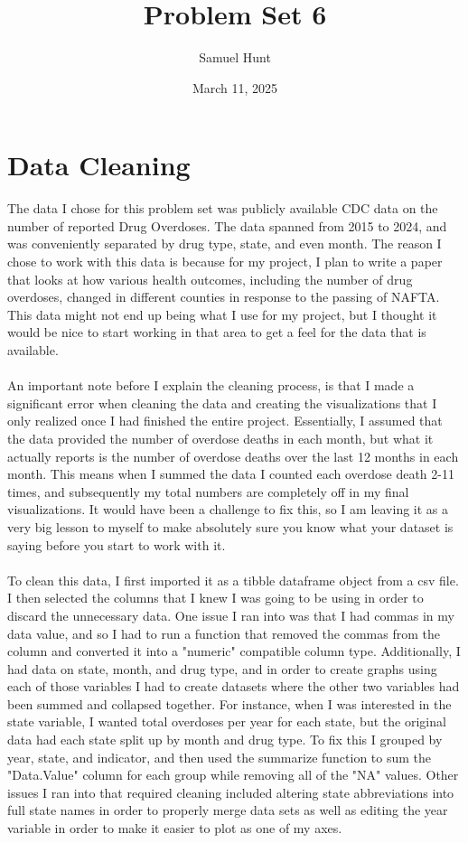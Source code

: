 \documentclass{article}
\title{Problem Set 6}
\author{Samuel Hunt}
\date{March 11, 2025}
\begin{document}
\maketitle

\section{Data Cleaning}
The data I chose for this problem set was publicly available CDC data on the number of reported Drug Overdoses. The data spanned from 2015 to 2024, and was conveniently separated by drug type, state, and even month. The reason I chose to work with this data is because for my project, I plan to write a paper that looks at how various health outcomes, including the number of drug overdoses, changed in different counties in response to the passing of NAFTA. This data might not end up being what I use for my project, but I thought it would be nice to start working in that area to get a feel for the data that is available. 
\\
\\An important note before I explain the cleaning process, is that I made a significant error when cleaning the data and creating the visualizations that I only realized once I had finished the entire project. Essentially, I assumed that the data provided the number of overdose deaths in each month, but what it actually reports is the number of overdose deaths over the last 12 months in each month. This means when I summed the data I counted each overdose death 2-11 times, and subsequently my total numbers are completely off in my final visualizations. It would have been a challenge to fix this, so I am leaving it as a very big lesson to myself to make absolutely sure you know what your dataset is saying before you start to work with it.
\\
\\To clean this data, I first imported it as a tibble dataframe object from a csv file. I then selected the columns that I knew I was going to be using in order to discard the unnecessary data. One issue I ran into was that I had commas in my data value, and so I had to run a function that removed the commas from the column and converted it into a "numeric" compatible column type. Additionally, I had data on state, month, and drug type, and in order to create graphs using each of those variables I had to create datasets where the other two variables had been summed and collapsed together. For instance, when I was interested in the state variable, I wanted total overdoses per year for each state, but the original data had each state split up by month and drug type. To fix this I grouped by year, state, and indicator, and then used the summarize function to sum the "Data.Value" column for each group while removing all of the "NA" values. Other issues I ran into that required cleaning included altering state abbreviations into full state names in order to properly merge data sets as well as editing the year variable in order to make it easier to plot as one of my axes.
\end{document}
